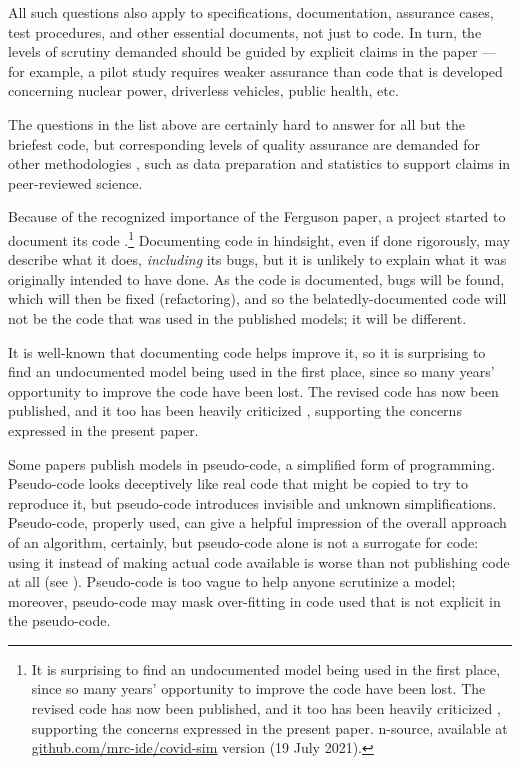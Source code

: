 \documentclass{comjnl}
\begin{document}
All such questions also apply to specifications, documentation, assurance cases, test procedures, and other essential documents, not just to code. In turn, the levels of scrutiny demanded should be guided by explicit claims in the paper \cite{essence-of-software} --- for example, a pilot study requires weaker assurance than code that is developed concerning nuclear power, driverless vehicles, public health, etc. 

The questions in the list above are certainly hard to answer for all but the briefest code, but corresponding levels of quality assurance are demanded for other methodologies \cite{notebooks,popper-conjectures-refutations,tripod,prisma,nih-policy,nih-nature}, such as data preparation and statistics to support claims in peer-reviewed science. 

Because of the recognized importance of the Ferguson paper, a project started to document its code  \cite{refactoring}.\footnote{It is surprising to find an undocumented model being used in the first place, since so many years' opportunity to improve the code have been lost. The revised code has now been published, and it too has been heavily criticized , supporting the concerns expressed in the present paper.
n-source, available at \url{github.com/mrc-ide/covid-sim} version (19 July 2021).} Documenting code in hindsight, even if done rigorously, may describe what it does, \emph{including\/} its bugs, but it is unlikely to explain what it was originally intended to have done. As the code is documented, bugs will be found, which will then be fixed (refactoring), and so the belatedly-documented code will not be the code that was used in the published models; it will be different. 

It is well-known that documenting code helps improve it, so it is surprising to find an undocumented model being used in the first place, since so many years' opportunity to improve the code have been lost. The revised code has now been published, and it too has been heavily criticized , supporting the concerns expressed in the present paper.

Some papers  publish models in pseudo-code, a simplified form of programming. Pseudo-code looks deceptively like real code that might be copied to try to reproduce it, but pseudo-code introduces invisible and unknown simplifications. Pseudo-code, properly used, can give a helpful impression of the overall approach of an algorithm, certainly, but pseudo-code alone is not a surrogate for code: using it instead of making actual code available is worse than not publishing code at all (see \cite{chinese}). Pseudo-code is too vague to help anyone scrutinize a model; moreover, pseudo-code may mask over-fitting in code used that is not explicit in the pseudo-code. 
\end{document}
